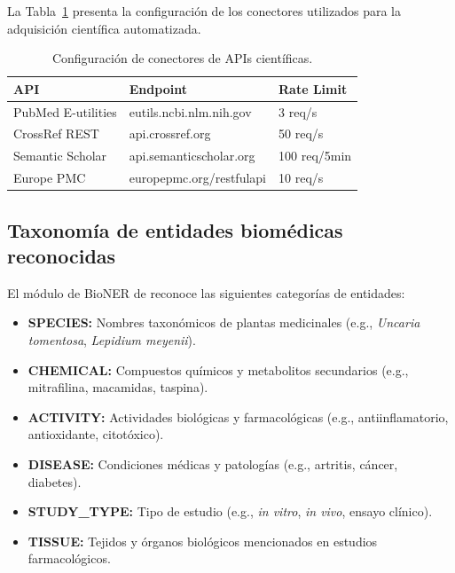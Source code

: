La Tabla~\ref{tab:api_config} presenta la configuración de los conectores utilizados para la adquisición científica automatizada.

\begin{table}[!t]
\centering
\caption{Configuración de conectores de APIs científicas.}
\label{tab:api_config}
\renewcommand{\arraystretch}{1.2}
\footnotesize
\begin{tabular}{l l l}
\toprule
\textbf{API} & \textbf{Endpoint} & \textbf{Rate Limit} \\
\midrule
PubMed E-utilities  & eutils.ncbi.nlm.nih.gov & 3 req/s \\
CrossRef REST       & api.crossref.org         & 50 req/s \\
Semantic Scholar    & api.semanticscholar.org  & 100 req/5min \\
Europe PMC          & europepmc.org/restfulapi & 10 req/s \\
\bottomrule
\end{tabular}
\end{table}

\subsection{Taxonomía de entidades biomédicas reconocidas}
\label{subsec:app_entities}

El módulo de BioNER de \sirca{} reconoce las siguientes categorías de entidades:

\begin{itemize}[leftmargin=*]
  \item \textbf{SPECIES:} Nombres taxonómicos de plantas medicinales (e.g., \textit{Uncaria tomentosa}, \textit{Lepidium meyenii}).
  \item \textbf{CHEMICAL:} Compuestos químicos y metabolitos secundarios (e.g., mitrafilina, macamidas, taspina).
  \item \textbf{ACTIVITY:} Actividades biológicas y farmacológicas (e.g., antiinflamatorio, antioxidante, citotóxico).
  \item \textbf{DISEASE:} Condiciones médicas y patologías (e.g., artritis, cáncer, diabetes).
  \item \textbf{STUDY\_TYPE:} Tipo de estudio (e.g., \textit{in vitro}, \textit{in vivo}, ensayo clínico).
  \item \textbf{TISSUE:} Tejidos y órganos biológicos mencionados en estudios farmacológicos.
\end{itemize}
